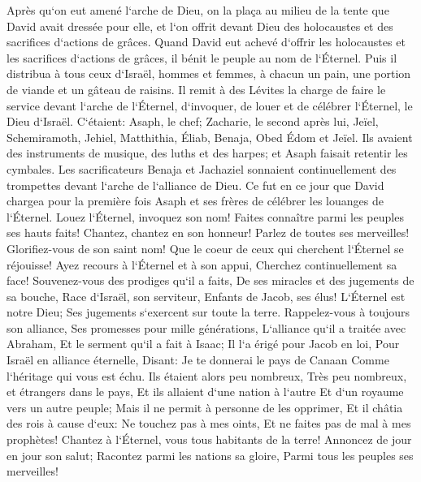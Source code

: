 \verse Après qu`on eut amené l`arche de Dieu, on la plaça au milieu de la tente que David avait dressée pour elle, et l`on offrit devant Dieu des holocaustes et des sacrifices d`actions de grâces. 
\verse Quand David eut achevé d`offrir les holocaustes et les sacrifices d`actions de grâces, il bénit le peuple au nom de l`Éternel. 
\verse Puis il distribua à tous ceux d`Israël, hommes et femmes, à chacun un pain, une portion de viande et un gâteau de raisins. 
\verse Il remit à des Lévites la charge de faire le service devant l`arche de l`Éternel, d`invoquer, de louer et de célébrer l`Éternel, le Dieu d`Israël. 
\verse C`étaient: Asaph, le chef; Zacharie, le second après lui, Jeïel, Schemiramoth, Jehiel, Matthithia, Éliab, Benaja, Obed Édom et Jeïel. Ils avaient des instruments de musique, des luths et des harpes; et Asaph faisait retentir les cymbales. 
\verse Les sacrificateurs Benaja et Jachaziel sonnaient continuellement des trompettes devant l`arche de l`alliance de Dieu. 
\verse Ce fut en ce jour que David chargea pour la première fois Asaph et ses frères de célébrer les louanges de l`Éternel. 
\verse Louez l`Éternel, invoquez son nom! Faites connaître parmi les peuples ses hauts faits! 
\verse Chantez, chantez en son honneur! Parlez de toutes ses merveilles! 
\verse Glorifiez-vous de son saint nom! Que le coeur de ceux qui cherchent l`Éternel se réjouisse! 
\verse Ayez recours à l`Éternel et à son appui, Cherchez continuellement sa face! 
\verse Souvenez-vous des prodiges qu`il a faits, De ses miracles et des jugements de sa bouche, 
\verse Race d`Israël, son serviteur, Enfants de Jacob, ses élus! 
\verse L`Éternel est notre Dieu; Ses jugements s`exercent sur toute la terre. 
\verse Rappelez-vous à toujours son alliance, Ses promesses pour mille générations, 
\verse L`alliance qu`il a traitée avec Abraham, Et le serment qu`il a fait à Isaac; 
\verse Il l`a érigé pour Jacob en loi, Pour Israël en alliance éternelle, 
\verse Disant: Je te donnerai le pays de Canaan Comme l`héritage qui vous est échu. 
\verse Ils étaient alors peu nombreux, Très peu nombreux, et étrangers dans le pays, 
\verse Et ils allaient d`une nation à l`autre Et d`un royaume vers un autre peuple; 
\verse Mais il ne permit à personne de les opprimer, Et il châtia des rois à cause d`eux: 
\verse Ne touchez pas à mes oints, Et ne faites pas de mal à mes prophètes! 
\verse Chantez à l`Éternel, vous tous habitants de la terre! Annoncez de jour en jour son salut; 
\verse Racontez parmi les nations sa gloire, Parmi tous les peuples ses merveilles! 
